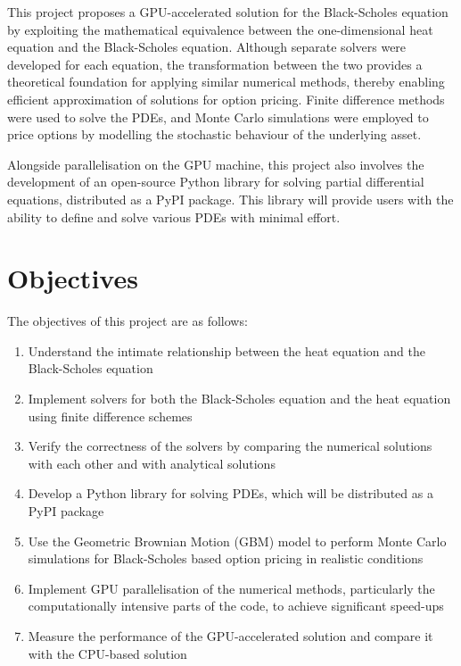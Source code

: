 This project proposes a GPU-accelerated solution for the Black-Scholes equation by exploiting the mathematical equivalence\cite{wilmott_1995_mathematics} between the one-dimensional heat equation and the Black-Scholes equation. Although separate solvers were developed for each equation, the transformation between the two provides a theoretical foundation for applying similar numerical methods, thereby enabling efficient approximation of solutions for option pricing. Finite difference methods were used to solve the PDEs, and Monte Carlo simulations were employed to price options by modelling the stochastic behaviour of the underlying asset.

Alongside parallelisation on the GPU machine, this project also involves the development of an open-source Python library for solving partial differential equations, distributed as a PyPI package. This library will provide users with the ability to define and solve various PDEs with minimal effort.

\section{Objectives}
The objectives of this project are as follows:
\begin{enumerate}
    \item Understand the intimate relationship between the heat equation and the Black-Scholes equation
    \item Implement solvers for both the Black-Scholes equation and the heat equation using finite difference schemes
    \item Verify the correctness of the solvers by comparing the numerical solutions with each other and with analytical solutions
    \item Develop a Python library for solving PDEs, which will be distributed as a PyPI package
    \item Use the Geometric Brownian Motion (GBM) model to perform Monte Carlo simulations for Black-Scholes based option pricing in realistic conditions
    \item Implement GPU parallelisation of the numerical methods, particularly the computationally intensive parts of the code, to achieve significant speed-ups
    \item Measure the performance of the GPU-accelerated solution and compare it with the CPU-based solution
\end{enumerate}
